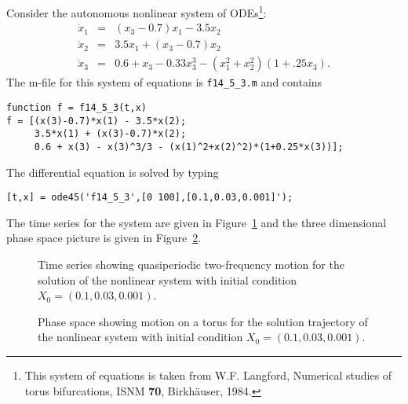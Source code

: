Consider the autonomous nonlinear system of ODEs\footnote{This system of
equations is taken from W.F. Langford, Numerical studies of torus bifurcations, 
ISNM {\bf 70}, Birkh\"auser, 1984.}:
\begin{equation*}  \label{e:ftor3}
\begin{array}{rcl}
\dot{x}_1 & = & (x_3-0.7)x_1 - 3.5x_2\\
\dot{x}_2 & = &  3.5x_1 + (x_3-0.7)x_2 \\
\dot{x}_3 & = & 0.6 + x_3 - 0.33x_3^3 - (x_1^2+x_2^2)(1+.25x_3).
\end{array}
\end{equation*}
The m-file for this system of equations is 
{\tt f14\_5\_3.m} and contains
\begin{verbatim}
function f = f14_5_3(t,x)
f = [(x(3)-0.7)*x(1) - 3.5*x(2); 
     3.5*x(1) + (x(3)-0.7)*x(2); 
     0.6 + x(3) - x(3)^3/3 - (x(1)^2+x(2)^2)*(1+0.25*x(3))];
\end{verbatim}
The differential equation  is solved by typing
\begin{verbatim}
[t,x] = ode45('f14_5_3',[0 100],[0.1,0.03,0.001]');
\end{verbatim}
The time series for the system  are given in 
Figure~\ref{F:tor3ts} and the three dimensional phase space
 picture is given in Figure~\ref{F:tor3ps}.

\begin{figure}[htb]
   \centerline{%
   }
   \caption{Time series showing quasiperiodic two-frequency motion for the 
	solution of the nonlinear system \protect{} with initial 
	condition $X_0=(0.1,0.03,0.001)$.}
   \label{F:tor3ts}
\end{figure}

\begin{figure}[htb]
   \centerline{%
   }
   \caption{Phase space showing motion on a torus for the solution trajectory 
	of the nonlinear system \protect{} with initial condition 
	$X_0=(0.1,0.03,0.001)$.}
   \label{F:tor3ps}
\end{figure}


\EXER

\CEXER

